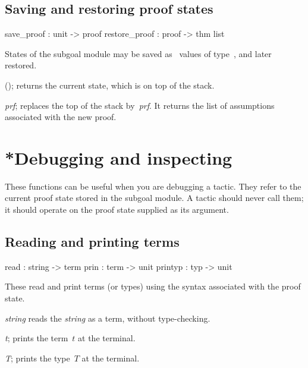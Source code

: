 \subsection{Saving and restoring proof states}
\begin{ttbox} 
save_proof    : unit -> proof
restore_proof : proof -> thm list
\end{ttbox}
States of the subgoal module may be saved as \ML\ values of
type~, and later restored.

\begin{ttdescription}
\item[\ttindexbold{save_proof}();]  
returns the current state, which is on top of the stack.

\item[\ttindexbold{restore_proof} {\it prf};]
  replaces the top of the stack by~{\it prf}.  It returns the list of
  assumptions associated with the new proof.
\end{ttdescription}


\section{*Debugging and inspecting}
These functions can be useful when you are debugging a tactic.  They refer
to the current proof state stored in the subgoal module.  A tactic
should never call them; it should operate on the proof state supplied as its
argument.

\subsection{Reading and printing terms}
\begin{ttbox} 
read    : string -> term
prin    : term -> unit
printyp : typ -> unit
\end{ttbox}
These read and print terms (or types) using the syntax associated with the
proof state.

\begin{ttdescription}
\item[\ttindexbold{read} {\it string}]  
reads the {\it string} as a term, without type-checking.

\item[\ttindexbold{prin} {\it t};]  
prints the term~$t$ at the terminal.

\item[\ttindexbold{printyp} {\it T};]  
prints the type~$T$ at the terminal.
\end{ttdescription}

